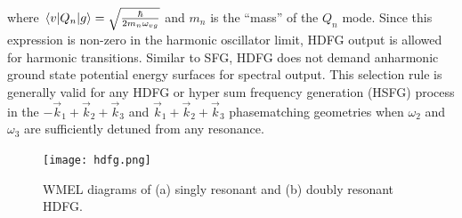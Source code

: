 \documentclass[aip, jcp, reprint, twocolumn]{revtex4-2}
\begin{document}
where $\mel{v}{Q_n}{g} = \sqrt{\frac{\hbar}{2m_n\omega_{vg}}}$ and $m_n$ is the ``mass'' of the $Q_n$ mode.  \cite{RN230}
Since this expression is non-zero in the harmonic oscillator limit, HDFG output is allowed for harmonic transitions. 
Similar to SFG, HDFG does not demand anharmonic ground state potential energy surfaces for spectral output. \cite{Shen94, Cho2000}
This selection rule is generally valid for any HDFG or hyper sum frequency generation (HSFG) process in the $-\vec{k}_1 + \vec{k}_2  + \vec{k}_3$ and $\vec{k}_1 + \vec{k}_2  + \vec{k}_3$ phasematching geometries when $\omega_2$ and $\omega_3$ are sufficiently detuned from any resonance.

\begin{figure}[!htbp]
	\centering
	\texttt{[image: hdfg.png]}
	\caption{WMEL diagrams of (a) singly resonant and (b) doubly resonant HDFG. 
	}
	\label{fig:hdfg}
\end{figure}
\end{document}
